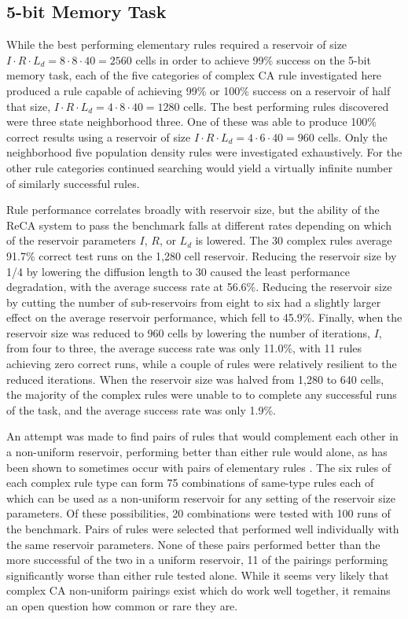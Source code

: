 \documentclass{elsarticle}
\begin{document}
\begin{multicols}{2}
	\subsection{5-bit Memory Task}
	While the best performing elementary rules required a reservoir of size $I \cdot R 
	\cdot L_{d} = 8 \cdot 8 \cdot 40 = 2560$ cells in order to achieve 99\% success on the 
	5-bit memory task, each of the five categories of complex CA rule investigated 
	here produced a rule capable of achieving 99\% or 100\% success on a reservoir 
	of half that size, $I \cdot R \cdot L_{d} = 4 \cdot 8 \cdot 40 = 1280$ cells. The best 
	performing rules discovered were three state neighborhood three. One of these 
	was able to produce 100\% correct results using a reservoir of size $I \cdot R \cdot 
	L_{d} = 4 \cdot 6 \cdot 40 = 960$ cells. Only the neighborhood five population density 
	rules were investigated exhaustively.  For the other rule categories continued 
	searching would yield a virtually infinite number of similarly successful 
	rules. \par Rule performance correlates broadly with reservoir size, but the 
	ability of the ReCA system to  pass the benchmark falls at different rates 
	depending on which of the reservoir parameters $I$, $R$, or $L_{d}$ is lowered.  
	The 30 complex rules average 91.7\% correct test runs on the 1,280 cell 
	reservoir.  Reducing the reservoir size by 1/4 by lowering the diffusion length 
	to 30 caused the least performance degradation, with the average success rate 
	at 56.6\%. Reducing the reservoir size by cutting the number of sub-reservoirs 
	from eight to six had a slightly larger effect on the average reservoir 
	performance, which fell to 45.9\%.  Finally, when the reservoir size was 
	reduced to 960 cells by lowering the number of iterations, $I$, from four to 
	three, the average success rate was only 11.0\%, with 11 rules achieving zero 
	correct runs, while a  couple of rules were  relatively resilient to the 
	reduced iterations. When the reservoir size was halved from 1,280 to 640  
	cells, the majority of the complex rules were unable to to complete any 
	successful runs of the task, and the average success rate was only 1.9\%. \par 
	An attempt was made to find pairs of rules that would complement each other in 
	a non-uniform reservoir, performing better than either rule would alone, as has 
	been shown to sometimes occur with pairs of elementary rules 
	\cite{nichele2017reservoir}. The six rules of each complex rule type can form 
	75 combinations of same-type rules each of which can be used as a non-uniform 
	reservoir for  any setting of the reservoir size parameters. Of these 
	possibilities, 20 combinations were tested with 100 runs of the benchmark.  
	Pairs of rules were selected that performed well individually with the same 
	reservoir parameters.  None of these pairs performed better than the more 
	successful of the two in a uniform reservoir, 11 of the pairings performing 
	significantly worse than either rule tested alone. While it seems very likely 
	that complex CA non-uniform pairings exist which do work well together, it 
	remains an open question how common or rare they are.
	

\end{multicols}
\end{document}
